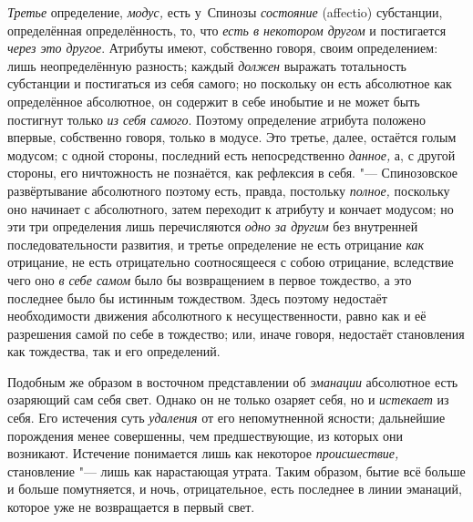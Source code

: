 {\em Третье} определение,
{\em модус,} есть у~Спинозы
{\em состояние} (affectio) субстанции, определённая
определённость, то, что {\em есть в некотором другом} и
постигается {\em через это другое}. Атрибуты имеют,
собственно говоря, своим определением: лишь неопределённую разность; каждый
{\em должен} выражать тотальность субстанции и
постигаться из себя самого; но поскольку он есть абсолютное как
определённое абсолютное, он содержит в себе инобытие и не может быть
постигнут только {\em из себя самого}. Поэтому
определение атрибута положено впервые, собственно говоря, только в модусе.
Это третье, далее, остаётся голым модусом; с одной стороны, последний есть
непосредственно {\em данное,} а, с другой стороны, его
ничтожность не познаётся, как рефлексия в себя. "--- Спинозовское
развёртывание абсолютного поэтому есть, правда, постольку
{\em полное,} поскольку оно начинает с абсолютного,
затем переходит к атрибуту и кончает модусом; но эти три определения лишь
перечисляются {\em одно за другим} без внутренней
последовательности развития, и третье определение не есть отрицание
{\em как} отрицание, не есть отрицательно соотносящееся
с собою отрицание, вследствие чего оно {\em в себе
самом} было бы возвращением в первое тождество, а это последнее было бы
истинным тождеством. Здесь поэтому недостаёт необходимости движения
абсолютного к несущественности, равно как и её разрешения самой по себе в
тождество; или, иначе говоря, недостаёт становления как тождества, так и
его определений.

Подобным же образом в восточном представлении об
{\em эманации} абсолютное есть озаряющий сам себя свет.
Однако он не только озаряет себя, но и {\em истекает}
из себя. Его истечения суть {\em удаления} от его
непомутненной ясности; дальнейшие порождения менее совершенны, чем
предшествующие, из которых они возникают. Истечение понимается лишь как
некоторое {\em происшествие,} становление "--- лишь как
нарастающая утрата. Таким образом, бытие всё больше и больше помутняется, и
ночь, отрицательное, есть последнее в линии эманаций, которое уже не
возвращается в первый свет.

